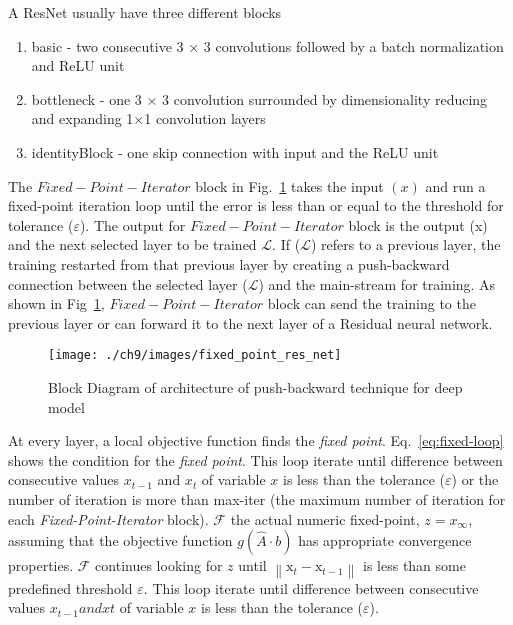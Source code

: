 \documentclass{article}
\begin{document}
A ResNet usually have three different blocks
\begin{enumerate}
    \item  basic - two consecutive 3 × 3 convolutions followed by a  batch normalization and ReLU unit
    \item bottleneck - one  3 × 3 convolution surrounded by dimensionality reducing and expanding 1×1 convolution layers
    \item identityBlock - one skip connection with input and the ReLU unit 
\end{enumerate}

The $Fixed-Point-Iterator$ block in Fig.~\ref{fig:res-net-fp} takes the input $(x)$ and run a fixed-point iteration loop until the error is less than or equal to the threshold for tolerance ($\varepsilon$). The output for $Fixed-Point-Iterator$ block is the output (x) and the next selected layer to be trained $\mathcal{L}$. If ($\mathcal{L}$) refers to a previous layer, the training restarted from that previous layer by creating a push-backward connection between the selected layer ($\mathcal{L}$) and the main-stream for training. As shown in Fig~\ref{fig:res-net-fp}, $Fixed-Point-Iterator$ block can send the training to the previous layer or can forward it to the next layer of a Residual neural network. 

\begin{figure}[htb]
	\centering
	\texttt{[image: ./ch9/images/fixed\_point\_res\_net]}
	\caption{Block Diagram of architecture of push-backward technique for deep model}
	\label{fig:res-net-fp}
\end{figure}


At every layer, a local objective function finds the \emph{fixed point}.  Eq.~\eqref{eq:fixed-loop} shows the condition for the \emph{fixed point}. This loop iterate until difference between consecutive values $x_{t-1}$ and $x_{t}$ of variable $x$ is less than the tolerance ($\varepsilon$) or the number of iteration is more than max-iter (the maximum number of iteration for each \emph{Fixed-Point-Iterator} block).  $\mathcal{F}$ the actual numeric fixed-point, $z = x_{\infty}$, assuming that the objective function $g(\hat{A}\cdot b)$ has appropriate convergence properties.  $\mathcal{F}$ continues looking for $z$ until $\left\|\mathrm{x}_{t}-\mathrm{x}_{t-1}\right\|$ is less than some predefined threshold $\varepsilon$. This loop iterate until difference between consecutive values $x_{t-1} and x{t} $ of variable $x$ is less than the tolerance ($\varepsilon$).
\end{document}
